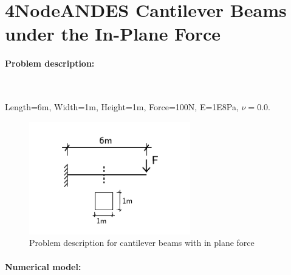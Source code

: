 












\section{4NodeANDES Cantilever Beams under the In-Plane Force}

\paragraph{Problem description:} ~

Length=6m, Width=1m, Height=1m, Force=100N, E=1E8Pa, $\nu=0.0$. 

\begin{figure}[!htb]
  \centering
  \includegraphics[width=7cm]{./Figure-files/_Chapter_Appendix_Illustrative_Examples/cantilever_6.pdf}
  \caption{Problem description for cantilever beams with in plane force}
  \label{fig Problem description for cantilever 4 2}
\end{figure}

\paragraph{Numerical model:} ~

